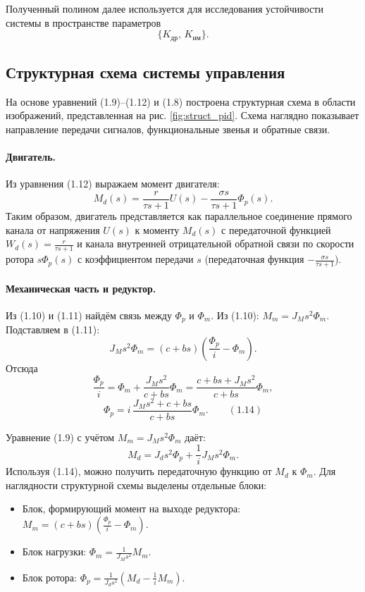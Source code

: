 \documentclass[a4paper, 14pt]{extarticle}
\begin{document}
Полученный полином далее используется для исследования устойчивости системы в пространстве параметров
\[
    \{K_{\text{др}},\,K_{\text{им}}\}.
\]

\subsection{Структурная схема системы управления}
На основе уравнений (1.9)–(1.12) и (1.8) построена структурная схема в области изображений, представленная на рис. \ref{fig:struct_pid}. Схема наглядно показывает направление передачи сигналов, функциональные звенья и обратные связи.

\paragraph{Двигатель.}
Из уравнения (1.12) выражаем момент двигателя:
\[
    M_d(s) =
    \frac{r}{\tau s+1}U(s)
    -
    \frac{\sigma s}{\tau s+1}\Phi_p(s).
\]
Таким образом, двигатель представляется как параллельное соединение прямого канала от напряжения \(U(s)\) к моменту \(M_d(s)\) с передаточной функцией \(W_d(s) = \frac{r}{\tau s+1}\) и канала внутренней отрицательной обратной связи по скорости ротора \(s\Phi_p(s)\) с коэффициентом передачи \(s\) (передаточная функция \(-\frac{\sigma s}{\tau s+1}\)).

\paragraph{Механическая часть и редуктор.}
Из (1.10) и (1.11) найдём связь между \(\Phi_p\) и \(\Phi_m\). Из (1.10): \(M_m = J_M s^2 \Phi_m\). Подставляем в (1.11):
\[
    J_M s^2 \Phi_m = (c+bs)\left(\frac{\Phi_p}{i} - \Phi_m\right).
\]
Отсюда
\[
    \frac{\Phi_p}{i} = \Phi_m + \frac{J_M s^2}{c+bs} \Phi_m = \frac{c+bs + J_M s^2}{c+bs} \Phi_m,
\]
\[
    \Phi_p = i\,\frac{J_M s^2 + c+bs}{c+bs} \Phi_m. \qquad (1.14)
\]

Уравнение (1.9) с учётом \(M_m = J_M s^2 \Phi_m\) даёт:
\[
    M_d = J_d s^2 \Phi_p + \frac{1}{i} J_M s^2 \Phi_m.
\]
Используя (1.14), можно получить передаточную функцию от \(M_d\) к \(\Phi_m\). Для наглядности структурной схемы выделены отдельные блоки:
\begin{itemize}
    \item Блок, формирующий момент на выходе редуктора: \(M_m = (c+bs)\left(\frac{\Phi_p}{i} - \Phi_m\right)\).
    \item Блок нагрузки: \(\Phi_m = \frac{1}{J_M s^2} M_m\).
    \item Блок ротора: \(\Phi_p = \frac{1}{J_d s^2}\left(M_d - \frac{1}{i}M_m\right)\).
\end{itemize}
\end{document}
